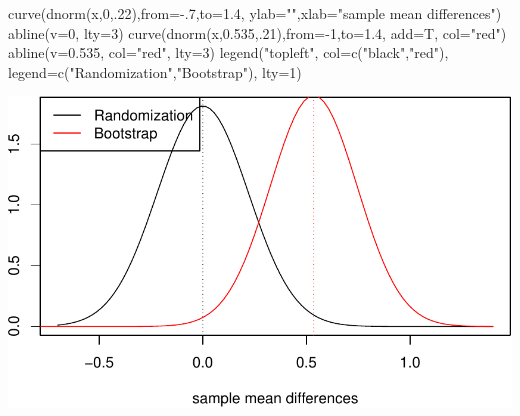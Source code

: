 \documentclass[
]{book}
\newenvironment{Shaded}{\begin{snugshade}}{\end{snugshade}}
\newcommand{\AttributeTok}[1]{\textcolor[rgb]{0.77,0.63,0.00}{#1}}
\newcommand{\DecValTok}[1]{\textcolor[rgb]{0.00,0.00,0.81}{#1}}
\newcommand{\FloatTok}[1]{\textcolor[rgb]{0.00,0.00,0.81}{#1}}
\newcommand{\FunctionTok}[1]{\textcolor[rgb]{0.00,0.00,0.00}{#1}}
\newcommand{\NormalTok}[1]{#1}
\newcommand{\SpecialCharTok}[1]{\textcolor[rgb]{0.00,0.00,0.00}{#1}}
\newcommand{\StringTok}[1]{\textcolor[rgb]{0.31,0.60,0.02}{#1}}
\begin{document}
\begin{Shaded}
\begin{Highlighting}[]
\FunctionTok{curve}\NormalTok{(}\FunctionTok{dnorm}\NormalTok{(x,}\DecValTok{0}\NormalTok{,.}\DecValTok{22}\NormalTok{),}\AttributeTok{from=}\SpecialCharTok{{-}}\NormalTok{.}\DecValTok{7}\NormalTok{,}\AttributeTok{to=}\FloatTok{1.4}\NormalTok{, }\AttributeTok{ylab=}\StringTok{""}\NormalTok{,}\AttributeTok{xlab=}\StringTok{"sample mean differences"}\NormalTok{)}
\FunctionTok{abline}\NormalTok{(}\AttributeTok{v=}\DecValTok{0}\NormalTok{, }\AttributeTok{lty=}\DecValTok{3}\NormalTok{)}
\FunctionTok{curve}\NormalTok{(}\FunctionTok{dnorm}\NormalTok{(x,}\FloatTok{0.535}\NormalTok{,.}\DecValTok{21}\NormalTok{),}\AttributeTok{from=}\SpecialCharTok{{-}}\DecValTok{1}\NormalTok{,}\AttributeTok{to=}\FloatTok{1.4}\NormalTok{, }\AttributeTok{add=}\NormalTok{T, }\AttributeTok{col=}\StringTok{"red"}\NormalTok{)}
\FunctionTok{abline}\NormalTok{(}\AttributeTok{v=}\FloatTok{0.535}\NormalTok{, }\AttributeTok{col=}\StringTok{"red"}\NormalTok{, }\AttributeTok{lty=}\DecValTok{3}\NormalTok{)}
\FunctionTok{legend}\NormalTok{(}\StringTok{"topleft"}\NormalTok{, }\AttributeTok{col=}\FunctionTok{c}\NormalTok{(}\StringTok{"black"}\NormalTok{,}\StringTok{"red"}\NormalTok{), }\AttributeTok{legend=}\FunctionTok{c}\NormalTok{(}\StringTok{"Randomization"}\NormalTok{,}\StringTok{"Bootstrap"}\NormalTok{), }\AttributeTok{lty=}\DecValTok{1}\NormalTok{)}
\end{Highlighting}
\end{Shaded}

\includegraphics[width=1\linewidth]{Class_Activity_13_files/figure-latex/unnamed-chunk-11-1}

\vspace*{1in}
\end{document}
